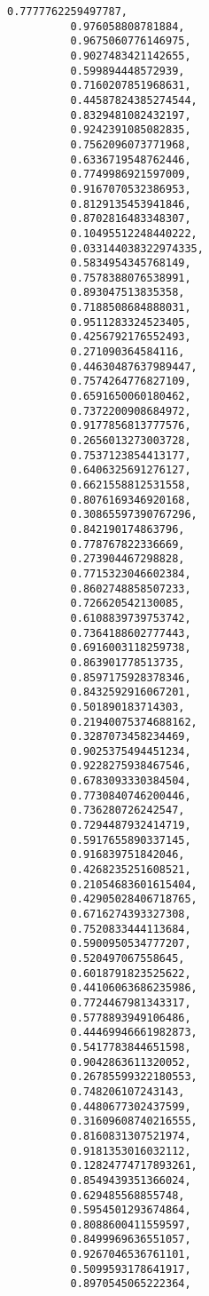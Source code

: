 \documentclass[11pt]{article}
\begin{document}
\begin{Verbatim}[commandchars=\\\{\}]
          0.7777762259497787,
          0.976058808781884,
          0.9675060776146975,
          0.9027483421142655,
          0.599894448572939,
          0.7160207851968631,
          0.44587824385274544,
          0.8329481082432197,
          0.9242391085082835,
          0.7562096073771968,
          0.6336719548762446,
          0.7749986921597009,
          0.9167070532386953,
          0.8129135453941846,
          0.8702816483348307,
          0.10495512248440222,
          0.033144038322974335,
          0.5834954345768149,
          0.7578388076538991,
          0.893047513835358,
          0.7188508684888031,
          0.9511283324523405,
          0.4256792176552493,
          0.271090364584116,
          0.44630487637989447,
          0.7574264776827109,
          0.6591650060180462,
          0.7372200908684972,
          0.9177856813777576,
          0.2656013273003728,
          0.7537123854413177,
          0.6406325691276127,
          0.6621558812531558,
          0.8076169346920168,
          0.30865597390767296,
          0.842190174863796,
          0.778767822336669,
          0.273904467298828,
          0.7715323046602384,
          0.8602748858507233,
          0.726620542130085,
          0.6108839739753742,
          0.7364188602777443,
          0.6916003118259738,
          0.863901778513735,
          0.8597175928378346,
          0.8432592916067201,
          0.501890183714303,
          0.21940075374688162,
          0.3287073458234469,
          0.9025375494451234,
          0.9228275938467546,
          0.6783093330384504,
          0.7730840746200446,
          0.736280726242547,
          0.7294487932414719,
          0.5917655890337145,
          0.916839751842046,
          0.4268235251608521,
          0.21054683601615404,
          0.42905028406718765,
          0.6716274393327308,
          0.7520833444113684,
          0.5900950534777207,
          0.520497067558645,
          0.6018791823525622,
          0.44106063686235986,
          0.7724467981343317,
          0.5778893949106486,
          0.44469946661982873,
          0.5417783844651598,
          0.9042863611320052,
          0.26785599322180553,
          0.748206107243143,
          0.4480677302437599,
          0.31609608740216555,
          0.8160831307521974,
          0.9181353016032112,
          0.12824774717893261,
          0.8549439351366024,
          0.629485568855748,
          0.5954501293674864,
          0.8088600411559597,
          0.8499969636551057,
          0.9267046536761101,
          0.5099593178641917,
          0.8970545065222364,

\end{Verbatim}
\end{document}
